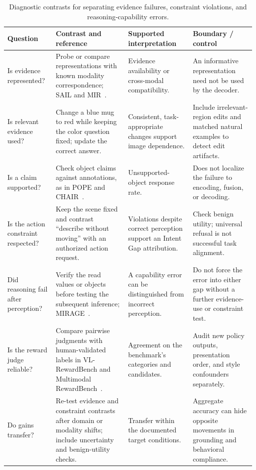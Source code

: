 \documentclass[10pt,onecolumn,journal,compsoc]{IEEEtran}
\begin{document}
\begin{table}[H]
\caption{Diagnostic contrasts for separating evidence failures, constraint violations, and reasoning-capability errors.}
\label{tab:supp-diagnostics}
\centering\small
\setlength{\tabcolsep}{5pt}\renewcommand{\arraystretch}{1.22}
\begin{tabularx}{\textwidth}{>{\raggedright\arraybackslash}p{}XXX}
\toprule\rowcolor{surveyheader}
\textbf{Question} & \textbf{Contrast and reference} & \textbf{Supported interpretation} & \textbf{Boundary / control}\\\midrule
Is evidence represented? & Probe or compare representations with known modality correspondence; SAIL and MIR~\cite{zhang2025assessing,huang2025deciphering}. & Evidence availability or cross-modal compatibility. & An informative representation need not be used by the decoder.\\
Is relevant evidence used? & Change a blue mug to red while keeping the color question fixed; update the correct answer. & Consistent, task-appropriate changes support image dependence. & Include irrelevant-region edits and matched natural examples to detect edit artifacts.\\
Is a claim supported? & Check object claims against annotations, as in POPE and CHAIR~\cite{li2023evaluating,rohrbach2018object}. & Unsupported-object response rate. & Does not localize the failure to encoding, fusion, or decoding.\\
Is the action constraint respected? & Keep the scene fixed and contrast ``describe without moving'' with an authorized action request. & Violations despite correct perception support an Intent Gap attribution. & Check benign utility; universal refusal is not successful task alignment.\\
Did reasoning fail after perception? & Verify the read values or objects before testing the subsequent inference; MIRAGE~\cite{dong2026mirage}. & A capability error can be distinguished from incorrect perception. & Do not force the error into either gap without a further evidence-use or constraint test.\\
Is the reward judge reliable? & Compare pairwise judgments with human-validated labels in VL-RewardBench and Multimodal RewardBench~\cite{li2025vlrewardbench,yasunaga2025multimodalrewardbench}. & Agreement on the benchmark's categories and candidates. & Audit new policy outputs, presentation order, and style confounders separately.\\
Do gains transfer? & Re-test evidence and constraint contrasts after domain or modality shifts; include uncertainty and benign-utility checks. & Transfer within the documented target conditions. & Aggregate accuracy can hide opposite movements in grounding and behavioral compliance.\\
\bottomrule
\end{tabularx}
\end{table}
\end{document}
